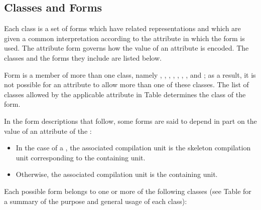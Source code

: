\subsection{Classes and Forms}
\label{datarep:classesandforms}
Each class is a set of forms which have related representations
and which are given a common interpretation according to the
attribute in which the form is used.
The attribute form governs how the value of an attribute is
encoded. 
The classes and the forms they include are listed below. 

Form \DWFORMsecoffsetTARG{} 
is a member of more than one class, namely 
\CLASSaddrptr,
\CLASSlineptr,
\CLASSloclist, \CLASSloclistsptr, 
\CLASSmacptr,
\CLASSrnglist{}, \CLASSrnglistsptr, 
and
\CLASSstroffsetsptr;
as a result, it is not possible for an
attribute to allow more than one of these classes.
The list of classes allowed by the applicable attribute in 
Table 
determines the class of the form.

In the form descriptions that follow, some forms are said
to depend in part on the value of an attribute of the
:
\begin{itemize}
\item
In the case of a \splitDWARFobjectfile{}, the associated
compilation unit is the skeleton compilation unit corresponding 
to the containing unit.
\item Otherwise, the associated compilation unit 
is the containing unit.
\end{itemize}

Each possible form belongs to one or more of the following classes
(see Table  for a summary of
the purpose and general usage of each class):

